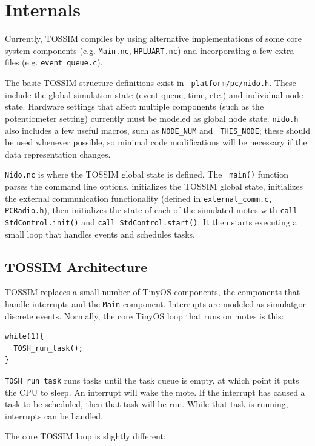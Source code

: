 \documentclass[10pt,fleqn]{article}
\def\sim{TOSSIM\xspace}
\begin{document}
\section{Internals}
\label{sec:internals}

Currently, \sim compiles by using alternative implementations of some
core system components (e.g. {\tt Main.nc}, {\tt HPLUART.nc}) and
incorporating a few extra files (e.g. {\tt event\_queue.c}).

The basic \sim structure definitions exist in {\tt
platform/pc/nido.h}. These include the global simulation state
(event queue, time, etc.) and individual node state. Hardware settings
that affect multiple components (such as the potentiometer setting)
currently must be modeled as global node state. {\tt nido.h} also
includes a few useful macros, such as {\tt NODE\_NUM} and {\tt
THIS\_NODE}; these should be used whenever possible, so minimal code
modifications will be necessary if the data representation
changes. 

{\tt Nido.nc} is where the \sim global state is defined. The {\tt
main()} function parses the command line options, initializes the
\sim global state, initializes the external communication
functionality (defined in {\tt external\_comm.c, PCRadio.h}), then
initializes the state of each of the simulated motes with {\tt call
StdControl.init()} and {\tt call StdControl.start()}. It then starts
executing a small loop that handles events and schedules tasks.

\subsection{\sim Architecture}

\sim replaces a small number of TinyOS components, the components
that handle interrupts and the {\tt Main} component. Interrupts are
modeled as simulatgor discrete events. Normally, the core TinyOS loop
that runs on motes is this:

\begin{verbatim}
while(1){
  TOSH_run_task();
}
\end{verbatim}

{\tt TOSH\_run\_task} runs tasks until the task queue is empty, at which
point it puts the CPU to sleep. An interrupt will wake the mote. If
the interrupt has caused a task to be scheduled, then that task will
be run. While that task is running, interrupts can be handled.

The core \sim loop is slightly different:
\end{document}
